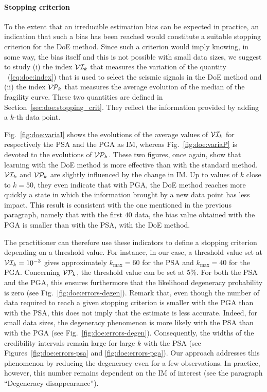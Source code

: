     \paragraph{{Stopping criterion}} {To the extent that an irreducible estimation bias can be expected in practice, an indication that such a bias has been reached would constitute a suitable stopping criterion for the DoE method. Since such a criterion would imply knowing, in some way, the bias itself and this is not possible with small data sizes, we suggest to study (i) the index $\mathcal{V}\mathcal{I}_k$ that measures the variation of the  quantity ~(\ref{eq:doe:index}) that is used to select the seismic signals in the DoE method and (ii) the index $\mathcal{V}\mathcal{P}_k$ that measures the average evolution of the median of the fragility curve. These two quantities are defined in Section~\ref{sec:doe:stopping_crit}. They reflect the information provided by adding a $k$-th data point. 

    Fig.~\ref{fig:doe:variaI} shows the evolutions of the average values of $\mathcal{V}\mathcal{I}_k$ for respectively the PSA and the PGA as IM, whereas Fig.~\ref{fig:doe:variaP} is devoted to the evolutions of $\mathcal{V}\mathcal{P}_k$. These two figures, once again, show that learning with the DoE method is more effective than with the standard method. $\mathcal{V}\mathcal{I}_k$ and $\mathcal{V}\mathcal{P}_k$ are slightly influenced by the change in IM. Up to values of $k$ close to $k=50$, they even indicate that with PGA, the DoE method reaches more quickly a state in which the information brought by a new data point has less impact. This result is consistent with the one mentioned in the previous paragraph, namely that with the first $40$ data, the bias value obtained with the PGA is smaller than with the PSA, with the DoE method.
    
    The practitioner can therefore use these indicators to define a stopping criterion depending on a threshold value. For instance, in our case, a threshold value set at $\mathcal{V}\mathcal{I}_k = 10^{-3}$ gives approximately $k_{\max} = 60$ for the PSA and $k_{\max} = 40$ for the PGA. Concerning $\mathcal{V}\mathcal{P}_k$, the threshold value can be set at $5 \% $. For both the PSA and the PGA, this ensures furthermore that the likelihood degeneracy probability is zero (see Fig.~\ref{fig:doe:errors-degen}). 
    Remark that, even though the number of data required to reach a given stopping criterion is smaller with the PGA than with the PSA, this does not imply that the estimate is less accurate. Indeed, for small data sizes, the degeneracy phenomenon is more likely with the PSA than with the PGA (see Fig.~\ref{fig:doe:errors-degen}). Consequently, the widths of the credibility intervals remain large for large $k$ with the PSA (see Figures~\ref{fig:doe:errors-psa} and \ref{fig:doe:errors-pga}). Our approach addresses this phenomenon by reducing the degeneracy even for a few observations. In practice, however, this number remains dependent on the IM of interest (see the paragraph ``Degeneracy disappearance'').
    
    }
        
